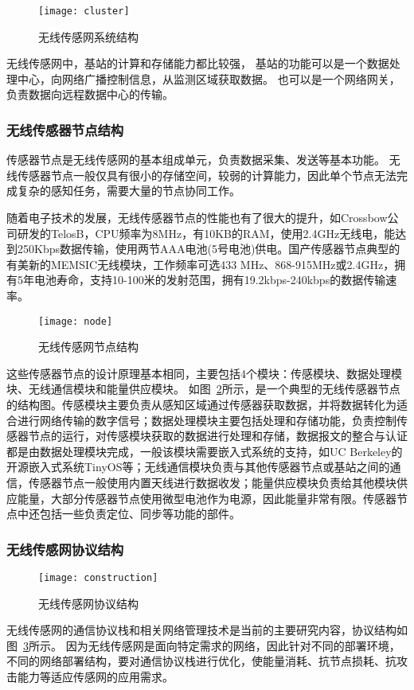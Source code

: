 \begin{figure}[htbp]
  \centering
  \texttt{[image: cluster]}
  \caption{无线传感网系统结构}
  \label{fig:cluster}
\end{figure}


无线传感网中，基站的计算和存储能力都比较强，
基站的功能可以是一个数据处理中心，向网络广播控制信息，从监测区域获取数据。
也可以是一个网络网关，负责数据向远程数据中心的传输。

\subsubsection{无线传感器节点结构}
传感器节点是无线传感网的基本组成单元，负责数据采集、发送等基本功能。
无线传感器节点一般仅具有很小的存储空间，较弱的计算能力，因此单个节点无法完成复杂的感知任务，需要大量的节点协同工作。

随着电子技术的发展，无线传感器节点的性能也有了很大的提升，如Crossbow公司研发的TelosB，CPU频率为8MHz，有10KB的RAM，使用2.4GHz无线电，能达到250Kbps数据传输，使用两节AAA电池(5号电池)供电。国产传感器节点典型的有美新的MEMSIC无线模块，工作频率可选433 MHz、868-915MHz或2.4GHz，拥有5年电池寿命，支持10-100米的发射范围，拥有19.2kbps-240kbps的数据传输速率。

\begin{figure}[htbp]
  \centering
  \texttt{[image: node]}
  \caption{无线传感网节点结构}
  \label{fig:node}
\end{figure}

这些传感器节点的设计原理基本相同，主要包括4个模块：传感模块、数据处理模块、无线通信模块和能量供应模块。
如图~\ref{fig:node}所示，是一个典型的无线传感器节点的结构图。传感模块主要负责从感知区域通过传感器获取数据，并将数据转化为适合进行网络传输的数字信号；数据处理模块主要包括处理和存储功能，负责控制传感器节点的运行，对传感模块获取的数据进行处理和存储，数据报文的整合与认证都是由数据处理模块完成，一般该模块需要嵌入式系统的支持，如UC Berkeley的开源嵌入式系统TinyOS等；无线通信模块负责与其他传感器节点或基站之间的通信，传感器节点一般使用内置天线进行数据收发；能量供应模块负责给其他模块供应能量，大部分传感器节点使用微型电池作为电源，因此能量非常有限。传感器节点中还包括一些负责定位、同步等功能的部件。

\subsubsection{无线传感网协议结构}

\begin{figure}[htbp]
  \centering
  \texttt{[image: construction]}
  \caption{无线传感网协议结构}
  \label{fig:construction}
\end{figure}
无线传感网的通信协议栈和相关网络管理技术是当前的主要研究内容，协议结构如图~\ref{fig:construction}所示。
因为无线传感网是面向特定需求的网络，因此针对不同的部署环境，不同的网络部署结构，要对通信协议栈进行优化，使能量消耗、抗节点损耗、抗攻击能力等适应传感网的应用需求。

